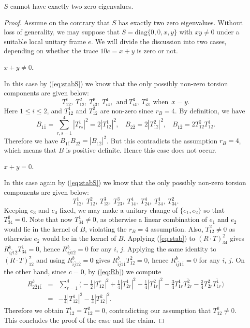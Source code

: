 \documentclass{amsart}
\begin{document}
\vspace{0.25cm}

 $S$ cannot have exactly two zero eigenvalues.
\begin{proof}
Assume on the contrary that  $S$ has exactly two zero eigenvalues. Without loss of generality, we may suppose that $S=\mbox{diag}\{ 0,0,x,y\}$ with $xy\neq 0$ under a suitable local unitary frame $e$. We will divide the discussion into two cases, depending on whether the trace $10c=x+y$ is zero or not.

\vspace{0.15cm}

 $x+y\neq 0$.


In this case by (\ref{eq:stabS}) we know that the only possibly non-zero torsion components are given below:
$$ T^1_{12}, \ T^2_{12}, \ T^3_{i3}, \ T^4_{i4},\ \ \mbox{and} \ T^3_{i4}, \ T^4_{i3} \ \ \mbox{when} \ \ x=y. $$
Here $1\leq i\leq 2$, and $T^1_{12}$ and $T^2_{12}$ are non-zero since $r_B=4$. By definition, we have
$$ B_{1\bar{1}}=\sum_{r,s=1}^4|T^1_{rs}|^2 = 2 |T^1_{12}|^2, \ \ \ \ B_{2\bar{2}} = 2 |T^2_{12}|^2, \ \ \ \ B_{1\bar{2}} = 2 T^2_{12} \overline{T^1_{12} } . $$
Therefore we have $B_{1\bar{1}} B_{2\bar{2}} = |B_{1\bar{2}}|^2$. But this contradicts the assumption $r_B=4$, which means that $B$ is positive definite. Hence this case does not occur.

\vspace{0.15cm}

 $x+y= 0$.

In this case again by (\ref{eq:stabS}) we know that the only possibly non-zero torsion components are given below:
$$ T^1_{12}, \ T^2_{12}, \ T^3_{13}, \ T^3_{23}, \ T^4_{14},\ T^4_{24}, \  T^1_{34}, \ T^2_{34}. $$
Keeping $e_3$ and $e_4$ fixed, we may make a unitary change of $\{e_1,e_2\}$ so that $T^2_{34}=0$.  Note that now $T^1_{34}\neq 0$, as otherwise a linear combination of $e_1$ and $e_2$ would lie in the kernel of $B$, violating the $r_B=4$ assumption. Also, $T^2_{12}\neq 0$ as otherwise $e_2$ would be in the kernel of $B$. Applying (\ref{eq:stab}) to $(R\cdot T)^2_{34}$ gives $R^b_{i\bar{j}1\bar{2}}T^1_{34}=0$, hence $R^b_{i\bar{j}1\bar{2}}=0$ for any $i$, $j$. Applying the same identity to $(R\cdot T)^2_{12}$ and using $R^b_{i\bar{j}1\bar{2}}=0$ gives $R^b_{i\bar{j}1\bar{1}}T^2_{12}=0$, hence $R^b_{i\bar{j}1\bar{1}}=0$ for any $i$, $j$. On the other hand, since $c=0$, by (\ref{eq:Rb}) we compute
\begin{eqnarray*}
 R^b_{2\bar{2}1\bar{1}} & = & \sum_{r=1}^4 \big( -\frac{1}{2}  |T^r_{12}|^2 +\frac{1}{4} |T^1_{2r}|^2 + \frac{1}{4} |T^2_{1r}|^2 -\frac{3}{4} T^1_{1r} \overline{ T^2_{2r}} -\frac{3}{4} T^2_{2r} \overline{ T^1_{1r}}  \big) \\
 & = & - \frac{1}{4}|T^1_{12}|^2 - \frac{1}{4}|T^2_{12}|^2.
 \end{eqnarray*}
Therefore we obtain $T^1_{12}=T^2_{12}=0$, contradicting our assumption that $T^2_{12}\neq 0$. This concludes the proof of the case and the claim.
\end{proof}
\end{document}
